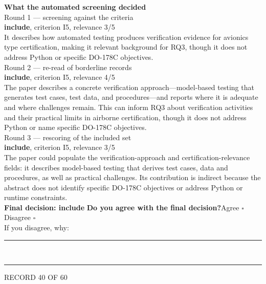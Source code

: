 \documentclass[11pt,a4paper]{article}
\begin{document}
\vspace{2.5mm}
{\small\textbf{What the automated screening decided}}\\[2mm]
{\footnotesize\color{soft}Round 1 --- screening against the criteria}\\[0.5mm]
{\small\textbf{include}, criterion I5, relevance 3/5}\\[0.5mm]
{\small It describes how automated testing produces verification evidence for avionics type certification, making it relevant background for RQ3, though it does not address Python or specific DO-178C objectives.}\\[2.5mm]
{\footnotesize\color{soft}Round 2 --- re-read of borderline records}\\[0.5mm]
{\small\textbf{include}, criterion I5, relevance 4/5}\\[0.5mm]
{\small The paper describes a concrete verification approach---model-based testing that generates test cases, test data, and procedures---and reports where it is adequate and where challenges remain. This can inform RQ3 about verification activities and their practical limits in airborne certification, though it does not address Python or name specific DO-178C objectives.}\\[2.5mm]
{\footnotesize\color{soft}Round 3 --- rescoring of the included set}\\[0.5mm]
{\small\textbf{include}, criterion I5, relevance 3/5}\\[0.5mm]
{\small The paper could populate the verification-approach and certification-relevance fields: it describes model-based testing that derives test cases, data and procedures, as well as practical challenges. Its contribution is indirect because the abstract does not identify specific DO-178C objectives or address Python or runtime constraints.}\\[2.5mm]
{\small\textbf{Final decision: include}}
\vspace{2mm}
{\small\textbf{Do you agree with the final decision?}\quad{}Agree $\square$\qquad{}Disagree $\square$}\\[1mm]
{\footnotesize\color{soft}If you disagree, why:}\\[1mm]
\color{rule}\rule{\linewidth}{0.3pt}\\[3mm]\rule{\linewidth}{0.3pt}\color{black}
\clearpage
{\color{soft}\footnotesize RECORD 40 OF 60}\\[1mm]
\end{document}
